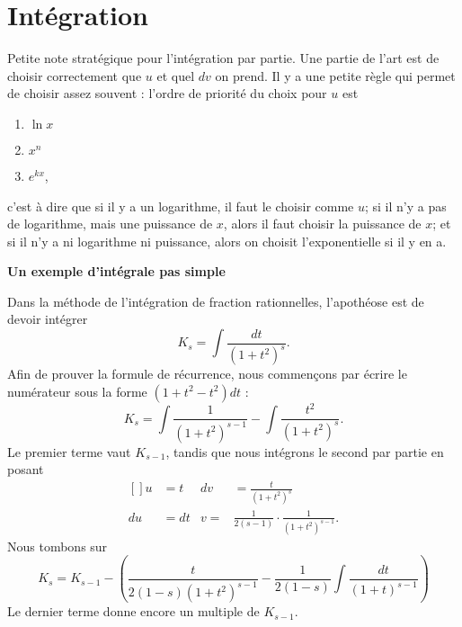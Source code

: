 \section{Intégration}

Petite note stratégique pour l'intégration par partie. Une partie de l'art est de choisir correctement que $u$ et quel $dv$ on prend. Il y a une petite règle qui permet de choisir assez souvent : l'ordre de priorité du choix pour $u$ est
\let\OldTheEnumi\theenumi
\renewcommand{\theenumi}{\arabic{enumi}}
\begin{enumerate}
\item $\ln x$
\item $x^n$
\item $ e^{kx}$,
\end{enumerate}
\let\theenumi\OldTheEnumi
c'est à dire que si il y a un logarithme, il faut le choisir comme $u$; si il n'y a pas de logarithme, mais une puissance de $x$, alors il faut choisir la puissance de $x$; et si il n'y a ni logarithme ni puissance, alors on choisit l'exponentielle si il y en a.

{\bf Un exemple d'intégrale pas simple}

Dans la méthode de l'intégration de fraction rationnelles, l'apothéose est de devoir intégrer 
\begin{equation}
	K_s=\int \frac{ dt }{ (1+t^2)^s }.
\end{equation}
Afin de prouver la formule de récurrence, nous commençons par écrire le numérateur sous la forme $(1+t^2-t^2)dt$ :
\begin{equation}
	K_s=\int \frac{ 1 }{ (1+t^2)^{s-1} }-\int \frac{ t^2 }{ (1+t^2)^s }.
\end{equation}
Le premier terme vaut $K_{s-1}$, tandis que nous intégrons le second par partie en posant
\begin{equation}
	\begin{aligned}[]
		u&=t		&	dv&=\frac{ t }{ (1+t^2)^s }\\
		du&=dt		&	v=&\frac{1}{ 2(s-1) }\cdot \frac{1}{ (1+t^2)^{s-1} }.
	\end{aligned}
\end{equation}
Nous tombons sur
\begin{equation}
	K_{s}=K_{s-1}-\left( \frac{ t }{ 2(1-s)(1+t^2)^{s-1} } - \frac{1}{ 2(1-s) }\int \frac{ dt }{ (1+t)^{s-1} } \right)
\end{equation}
Le dernier terme donne encore un multiple de $K_{s-1}$.

